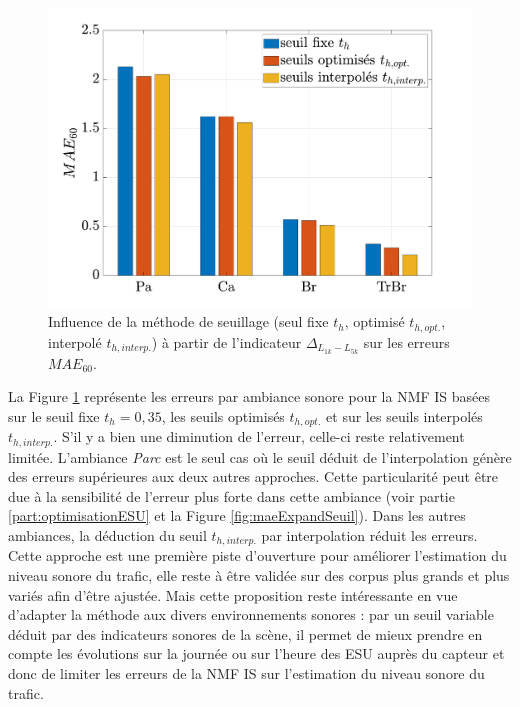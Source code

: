 \begin{figure}[h]
\centering
\includegraphics[width=.7\linewidth]{./figures/resultats/erreursSeuilOpt.pdf}
\caption{Influence de la méthode de seuillage (seul fixe $t_h$, optimisé $t_{h,opt.}$, interpolé $t_{h,interp.}$) à partir de l'indicateur $\Delta_{L_{1k}-L_{5k}}$ sur les erreurs $MAE_{60}$.}
\label{fig:erreurInterp}
\end{figure}

La Figure \ref{fig:erreurInterp} représente les erreurs par ambiance sonore pour la NMF IS basées sur le seuil fixe $t_h = 0,35$, les seuils optimisés $t_{h,opt.}$ et sur les seuils interpolés $t_{h,interp.}$. S'il y a bien une diminution de l'erreur, celle-ci reste relativement limitée. L'ambiance \textit{Parc} est le seul cas où le seuil déduit de l'interpolation génère des erreurs supérieures aux deux autres approches. Cette particularité peut être due à la sensibilité de l'erreur plus forte dans cette ambiance (voir partie \ref{part:optimisationESU} et la Figure \ref{fig:maeExpandSeuil}). Dans les autres ambiances, la déduction du seuil $t_{h,interp.}$ par interpolation réduit les erreurs. \\

Cette approche est une première piste d'ouverture pour améliorer l'estimation du niveau sonore du trafic, elle reste à être validée sur des corpus plus grands et plus variés afin d'être ajustée. 
Mais cette proposition reste intéressante en vue d'adapter la méthode aux divers environnements sonores : par un seuil variable déduit par des indicateurs sonores de la scène, il permet de mieux prendre en compte les évolutions sur la journée ou sur l'heure des ESU auprès du capteur et donc de limiter les erreurs de la NMF IS sur l'estimation du niveau sonore du trafic.